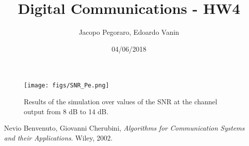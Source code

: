\documentclass[a4paper,11.5pt]{article}
\title{Digital Communications - HW4}
\author{Jacopo Pegoraro, Edoardo Vanin}
\date{04/06/2018}
\begin{document}
\maketitle




\begin{figure}[H]
	\begin{center}   
		\texttt{[image: figs/SNR\_Pe.png]} 
		\caption{Results of the simulation over values of the SNR at the channel output from 8 dB to 14 dB.}
		\label{fig:SNR}
	\end{center}
\end{figure}


 
\begin{thebibliography}{15}
	
	Nevio Benvenuto, Giovanni Cherubini,
	\textit{Algorithms for Communication Systems and their Applications}. 
	Wiley, 2002.
	

	
\end{thebibliography}
\end{document}
